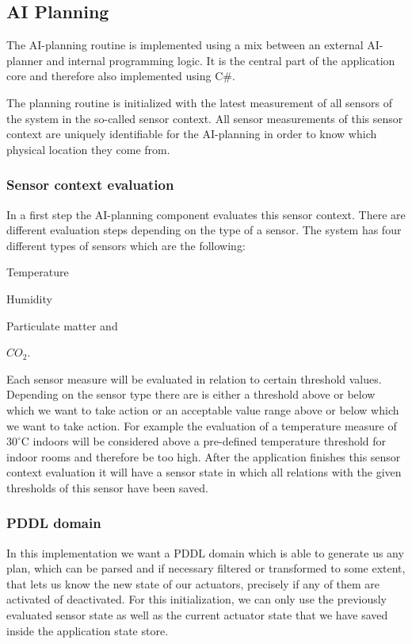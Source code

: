 \subsection{AI Planning}\label{subsec:ai-planning}
The AI-planning routine is implemented using a mix between an external AI-planner and internal programming logic.
It is the central part of the application core and therefore also implemented using C\#.

The planning routine is initialized with the latest measurement of all sensors of the system in the so-called sensor context.
All sensor measurements of this sensor context are uniquely identifiable for the AI-planning in order to know which physical location they come from.

\subsubsection{Sensor context evaluation}\label{subsubsec:sensor-context-evaluation}
In a first step the AI-planning component evaluates this sensor context.
There are different evaluation steps depending on the type of a sensor.
The system has four different types of sensors which are the following:
\begin{inparaenum}[1)]
    \item Temperature
    \item Humidity
    \item Particulate matter and
    \item $CO_2$.
\end{inparaenum}

Each sensor measure will be evaluated in relation to certain threshold values.
Depending on the sensor type there are is either a threshold above or below which we want to take action or an acceptable value range above or below which we want to take action.
For example the evaluation of a temperature measure of $30^\circ$C indoors will be considered above a pre-defined temperature threshold for indoor rooms and therefore be too high.
After the application finishes this sensor context evaluation it will have a sensor state in which all relations with the given thresholds of this sensor have been saved.

\subsubsection{PDDL domain}\label{subsubsec:pddl-domain}
In this implementation we want a PDDL domain which is able to generate us any plan, which can be parsed and if necessary filtered or transformed to some extent, that lets us know the new state of our actuators, precisely if any of them are activated of deactivated.
For this initialization, we can only use the previously evaluated sensor state as well as the current actuator state that we have saved inside the application state store.

